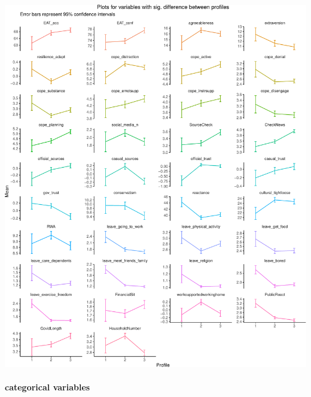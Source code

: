 \documentclass[]{article}
\let\oldparagraph\paragraph
\renewcommand{\paragraph}[1]{\oldparagraph{#1}\mbox{}}
\begin{document}
\newpage

\begin{center}\includegraphics{lpa_analyses_files/figure-latex/unnamed-chunk-18-1} \end{center}

\newpage

\hypertarget{categorical-variables-1}{%
\paragraph{categorical variables}\label{categorical-variables-1}}
\end{document}
